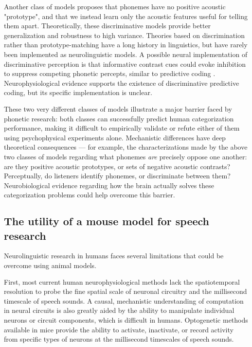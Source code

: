 \documentclass[preprint, NumberedRefs]{JASAnew}\usepackage[]{graphicx}\usepackage[]{color}
\begin{document}
Another class of models proposes that phonemes have no positive acoustic "prototype", and that we instead learn only the acoustic features useful for telling them apart\cite{Kluender2013a}. Theoretically, these discriminative models provide better generalization and robustness to high variance\cite{Ng2002a}. Theories based on discrimination rather than prototype-matching have a long history in linguistics\cite{Saussure1916}, but have rarely been implemented as neurolinguistic models. A possible neural implementation of discriminative perception is that informative contrast cues could evoke inhibition to suppress competing phonetic percepts, similar to predictive coding \cite{Rutishauser2015,Kluender2013a,Dresher2008}. Neurophysiological evidence supports the existence of discriminative predictive coding, but its specific implementation is unclear\cite{Blank2016,Gagnepain2012}.

These two very different classes of models illustrate a major barrier faced by phonetic research: both classes can successfully predict human categorization performance, making it difficult to empirically validate or refute either of them using psychophysical experiments alone. Mechanistic differences have deep theoretical consequences --- for example, the characterizations made by the above two classes of models regarding what phonemes \textit{are} precisely oppose one another: are they positive acoustic prototypes, or sets of negative acoustic contrasts? Perceptually, do listeners identify phonemes, or discriminate between them? Neurobiological evidence regarding how the brain actually solves these categorization problems could help overcome this barrier.

\subsection{The utility of a mouse model for speech research}

Neurolinguistic research in humans faces several limitations that could be overcome using animal models.

First, most current human neurophysiological methods lack the spatiotemporal resolution to probe the fine spatial scale of neuronal circuitry and the millisecond timescale of speech sounds. A causal, mechanistic understanding of computation in neural circuits is also greatly aided by the ability to manipulate individual neurons or circuit components, which is difficult in humans. Optogenetic methods available in mice provide the ability to activate, inactivate, or record activity from specific types of neurons at the millisecond timescales of speech sounds.
\end{document}
